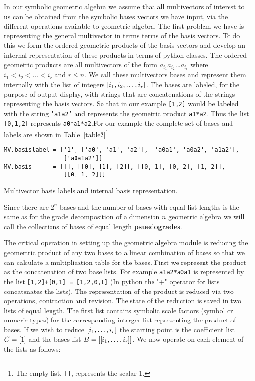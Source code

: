\documentclass{article}
\begin{document}
In our symbolic geometric algebra we assume that all multivectors of interest to us can be obtained from the
symbolic bases vectors we have input, via the different operations available to geometric algebra. The first
problem we have is representing the general multivector in terms terms of the basis vectors.  To do this we 
form the ordered geometric products of the basis vectors and develop an internal representation of these 
products in terms of python classes.  The ordered geometric products are all multivectors of the form
$a_{i_{1}}a_{i_{2}}\dots a_{i_{r}}$ where $i_{1}<i_{2}<\dots <i_{r}$ and $r \le n$. We call these
multivectors bases and represent them internally with the list of integers 
$\left [ i_{1},i_{2},\dots,i_{r}\right ]$. The bases are labeled, for the purpose of output display, with strings
that are concatenations of the strings representing the basis vectors.  So that in our example 
{\tt [1,2]} would be labeled with the string {\tt 'a1a2'} and represents the geometric product 
{\tt a1*a2}. Thus the list {\tt [0,1,2]} represents {\tt a0*a1*a2}.For our example the complete set
 of bases and labels
are shown in Table~\ref{table2}\footnote{The empty list, {\tt[]}, represents the scalar 1.}
\begin{table}[h]
\begin{verbatim}
MV.basislabel = ['1', ['a0', 'a1', 'a2'], ['a0a1', 'a0a2', 'a1a2'], 
                 ['a0a1a2']]
MV.basis      = [[], [[0], [1], [2]], [[0, 1], [0, 2], [1, 2]], 
                 [[0, 1, 2]]]
\end{verbatim}
\caption{Multivector basis labels and internal basis representation.}\label{table2}
\end{table}
Since there are $2^{n}$ bases and the number of bases with equal list lengths is the same as for the 
grade decomposition of a dimension $n$ geometric algebra we will call the collections of bases of equal length
{\bf psuedogrades}.

The critical operation in setting up the geometric algebra module is reducing the geomertric product of any two bases to
a linear combination of bases so that we can calculate a multiplication table for the bases.  
First we represent the product as the concatenation of two base lists.  For
example {\tt a1a2*a0a1} is represented by the list {\tt [1,2]+[0,1] = [1,2,0,1]} (In python the "+" operator for lists concatenates the lists). The representation of the product is reduced via two operations, contraction and
revision. The state of the reduction is saved in two lists of equal length.  The first list contains symbolic
scale factors (symbol or numeric types) for the corresponding interger list representing the product of 
bases.  If we wish to reduce $\left [ i_{1},\dots,i_{r}\right ]$ the starting point is the coefficient list 
$C = \left [ 1 \right ]$ and the bases list $B = \left [ \left [ i_{1},\dots,i_{r}\right ] \right ]$.  We now operate 
on each element of the lists as follows:
\end{document}
